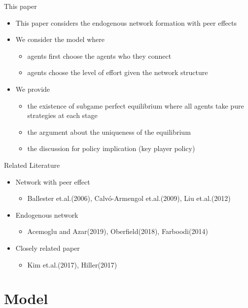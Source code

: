 \documentclass[10pt,dvipdfmx]{beamer}
\begin{document}
\begin{frame}{This paper}
\begin{itemize}
    \item This paper considers the endogenous network formation with peer effects
    \item We consider the model where
    \begin{itemize}
        \item agents first choose the agents who they connect
        \item agents choose the level of effort given the network structure
    \end{itemize}
    \item We provide
    \begin{itemize}
        \item the existence of subgame perfect equilibrium where all agents take pure strategies at each stage
        \item the argument about the uniqueness of the equilibrium
        \item the discussion for policy implication (key player policy)
    \end{itemize}
\end{itemize}
\end{frame}

\begin{frame}{Related Literature}
\begin{itemize}
    \item Network with peer effect
    \begin{itemize}
        \item Ballester et.al.(2006), Calv\'{o}-Armengol et.al.(2009), Liu et.al.(2012)
    \end{itemize}
    \item Endogenous network
    \begin{itemize}
        \item Acemoglu and Azar(2019), Oberfield(2018), Farboodi(2014)
    \end{itemize}
    \item Closely related paper
    \begin{itemize}
        \item Kim et.al.(2017), Hiller(2017)
    \end{itemize}
\end{itemize}
\end{frame}


\section{Model}
\end{document}
